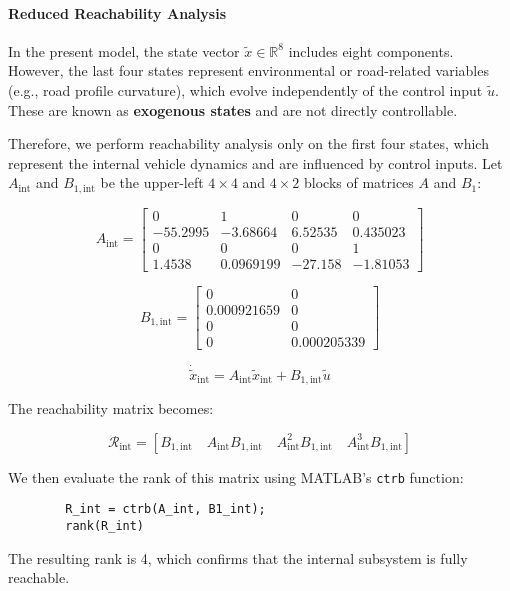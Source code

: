 \documentclass[]{report}
\begin{document}
	\paragraph{Reduced Reachability Analysis}
	
	In the present model, the state vector $\tilde{x} \in \mathbb{R}^8$ includes eight components. However, the last four states represent environmental or road-related variables (e.g., road profile curvature), which evolve independently of the control input $\tilde{u}$. These are known as \textbf{exogenous states} and are not directly controllable.
	
	Therefore, we perform reachability analysis only on the first four states, which represent the internal vehicle dynamics and are influenced by control inputs. Let $A_{\text{int}}$ and $B_{1, \text{int}}$ be the upper-left $4 \times 4$ and $4 \times 2$ blocks of matrices $A$ and $B_1$:
	
	\[
	A_{\text{int}} =
	\begin{bmatrix}
		0 & 1 & 0 & 0 \\
		-55.2995 & -3.68664 & 6.52535 & 0.435023 \\
		0 & 0 & 0 & 1 \\
		1.4538 & 0.0969199 & -27.158 & -1.81053 
	\end{bmatrix}
	\]
	
	\[
	B_{1,\text{int}} =
	\begin{bmatrix}
		0 & 0 \\
		0.000921659 & 0  \\
		0 & 0 \\
		0 & 0.000205339 
		
	\end{bmatrix}
	\]
	
	\[
	\dot{\tilde{x}}_{\text{int}} = A_{\text{int}} \tilde{x}_{\text{int}} + B_{1,\text{int}} \tilde{u}
	\]
	
	The reachability matrix becomes:
	
	\[
	\mathcal{R}_{\text{int}} = \left[ B_{1,\text{int}} \quad A_{\text{int}}B_{1,\text{int}} \quad A_{\text{int}}^2B_{1,\text{int}} \quad A_{\text{int}}^3B_{1,\text{int}} \right]
	\]
	
	We then evaluate the rank of this matrix using MATLAB's \texttt{ctrb} function:
	
	\begin{verbatim}
		R_int = ctrb(A_int, B1_int);
		rank(R_int)
	\end{verbatim}
	
	The resulting rank is 4, which confirms that the internal subsystem is fully reachable.
	
\end{document}
